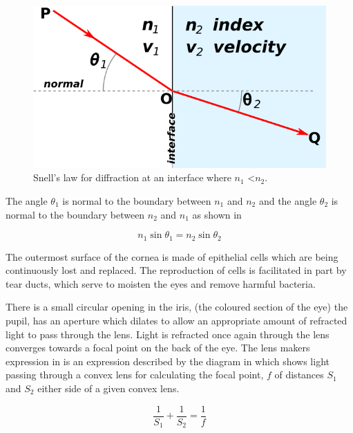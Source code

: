 \begin{figure}[htbp]
  \centering
    \includegraphics{figures/snells}
  \caption{Snell's law for diffraction at an interface where $n_1$ \textless $n_2$.\cite{wikisnell}}
  \label{fig:snell}
\end{figure}

The angle $\theta_1$ is normal to the boundary between $n_1$ and $n_2$
and the angle $\theta_2$ is normal to the boundary between $n_2$ and $n_1$
as shown in 

\begin{equation}
n_1\sin\theta_1=n_2\sin\theta_2
\label{eq:refractive}
\end{equation}

The outermost surface of the cornea is made of epithelial cells which
are being continuously lost and replaced.
\cite{jester1999cellular,hassell2010molecular} The reproduction
of cells is facilitated in part by tear ducts, which  serve to
moisten the eyes and remove harmful bacteria.\cite{holly1977tear}

There is a small circular opening in the iris, (the coloured section of
the eye) the pupil, has an aperture which dilates to allow an appropriate
amount of refracted light to pass through the lens. Light is refracted
once again through the lens converges towards a focal point on the back
of the eye. The lens makers expression in  is an
expression described by the diagram in  which
shows light passing through a convex lens for calculating the focal point,
$f$ of distances $S_1$ and $S_2$ either side of a given convex lens.
\cite{greivenkamp2004field}

\begin{equation}
\frac{1}{S_1} + \frac{1}{S_2} = \frac{1}{f}
\label{eq:lens_makers}
\end{equation}

